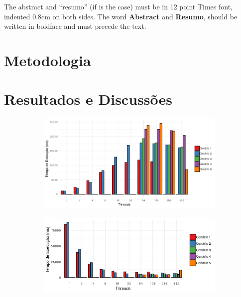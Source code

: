 \documentclass[12pt]{article}
\begin{document}
The abstract and ``resumo'' (if is the case) must be in 12 point Times font,
indented 0.8cm on both sides. The word \textbf{Abstract} and \textbf{Resumo},
should be written in boldface and must precede the text.

\section{Metodologia}
\label{sec:metodologia}

\section{Resultados e Discussões}
\label{sec:resultados}

\begin{figure}
    \centering
    \begin{subfigure}[b]{0.49\textwidth}
        \centering
        \includegraphics[width=\textwidth]{images/figura11}
        \caption{}
        \label{fig:mean and std of net14}
    \end{subfigure}
        \hfill
    \begin{subfigure}[b]{0.49\textwidth}  
        \centering 
        \includegraphics[width=\textwidth]{images/figura12}
        \caption{}%
    \end{subfigure}

\end{figure}
\end{document}
